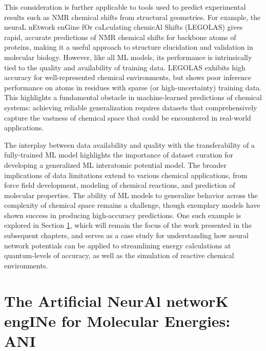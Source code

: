 This consideration is further applicable to tools used to predict experimental results such as NMR chemical shifts \cite{shiftx, legolas} from structural geometries.
For example, the neuraL nEtwork enGine fOr caLculating chemicAl Shifts (LEGOLAS) \cite{legolas} gives rapid, accurate predictions of NMR chemical shifts for backbone atoms of proteins, making it a useful approach to structure elucidation and validation in molecular biology.
However, like all ML models, its performance is intrinsically tied to the quality and availability of training data.
LEGOLAS exhibits high accuracy for well-represented chemical environments, but shows poor inference performance on atoms in residues with sparse (or high-uncertainty) training data.
This highlights a fundamental obstacle in machine-learned predictions of chemical systems: achieving reliable generalization requires datasets that comprehensively capture the vastness of chemical space that could be encountered in real-world applications.

The interplay between data availability and quality with the transferability of a fully-trained ML model highlights the importance of dataset curation for developing a generalized ML interatomic potential model.
The broader implications of data limitations extend to various chemical applications, from force field development, modeling of chemical reactions, and prediction of molecular properties.
The ability of ML models to generalize behavior across the complexity of chemical space remains a challenge, though exemplary models have shown success in producing high-accuracy predictions.
One such example is explored in Section \ref{sec:ANI_intro}, which will remain the focus of the work presented in the subsequent chapters, and serves as a case study for understanding how neural network potentials can be applied to streamlining energy calculations at quantum-levels of accuracy, as well as the simulation of reactive chemical environments.


\section{The Artificial NeurAl networK engINe for Molecular Energies: ANI}
\label{sec:ANI_intro}


